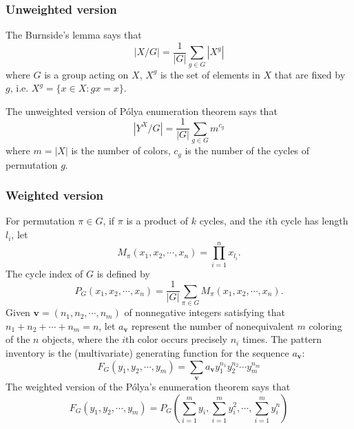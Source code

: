 \subsubsection{Unweighted version}

The Burnside's lemma says that
$$ |X / G| = \frac{1}{|G|} \sum_{g \in G} |X^g| $$
where $G$ is a group acting on $X$, $X^g$ is the set of elements in $X$ that are fixed by $g$, i.e. $X^g = \{x \in X : gx = x\}$.

The unweighted version of P\'olya enumeration theorem says that
$$ |Y^X / G| = \frac{1}{|G|} \sum_{g \in G} m^{c_g} $$
where $m = |X|$ is the number of colors, $c_g$ is the number of the cycles of permutation $g$.

\subsubsection{Weighted version}
For permutation $\pi \in G$, if $\pi$ is a product of $k$ cycles, and the $i$th cycle has length $l_i$, let
$$ M_{\pi}(x_1, x_2, \cdots, x_n) = \prod_{i=1}^n x_{l_i} .$$
The cycle index of $G$ is defined by
$$ P_G(x_1, x_2, \cdots, x_n) = \frac{1}{|G|} \sum_{\pi \in G} M_{\pi}(x_1, x_2, \cdots, x_n). $$
Given $\bm{v} = (n_1, n_2, \cdots, n_m)$ of nonnegative integers satisfying that $n_1 + n_2 + \cdots + n_m = n$, let $a_{\bm{v}}$ represent the number of nonequivalent $m$ coloring of the $n$ objects, where the $i$th color occurs precisely $n_i$ times. The pattern inventory is the (multivariate) generating function for the sequence $a_{\bm{v}}$: 
$$ F_G(y_1, y_2, \cdots, y_m) = \sum_{\bm{v}} a_{\bm{v}} y_1^{n_1} y_2^{n_2} \cdots y_m^{n_m} $$
The weighted version of the P\'olya's enumeration theorem says that
$$
F_G(y_1, y_2, \cdots, y_m) = P_{G}(\sum_{i=1}^m y_i, \sum_{i=1}^m y_i^2, \cdots, \sum_{i=1}^m y_i^n)$$


